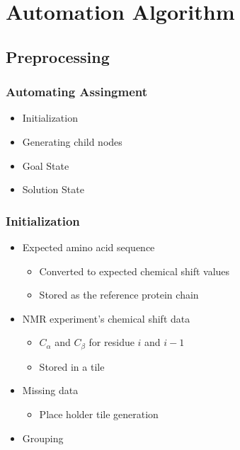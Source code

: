 \documentclass{beamer}
\begin{document}
\section{Automation Algorithm}

\subsection{Preprocessing}
\begin{frame}
\frametitle{Automating Assingment}
	\begin{itemize}
		\item Initialization
		\item Generating child nodes
		\item Goal State
		\item Solution State
	\end{itemize}
\end{frame}

\begin{frame}
	\frametitle{Initialization}
	\begin{itemize}
		\item Expected amino acid sequence
		\begin{itemize}
			\item Converted to expected chemical shift values
			\item Stored as the reference protein chain
		\end{itemize}
		\item NMR experiment's chemical shift data
		\begin{itemize}
			\item $C_\alpha$ and $C_{\beta}$ for residue $i$ and $i-1$
			\item Stored in a tile
		\end{itemize}
		\item Missing data
		\begin{itemize}
			\item Place holder tile generation
		\end{itemize}
		\item Grouping 
	\end{itemize}
\end{frame}
\end{document}
